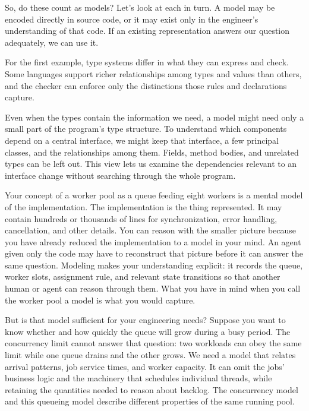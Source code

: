So, do these count as models? Let's look at each in turn. A model may be encoded directly in source code, or it may exist only in the engineer's understanding of that code. If an existing representation answers our question adequately, we can use it.

For the first example, type systems differ in what they can express and check. Some languages support richer relationships among types and values than others, and the checker can enforce only the distinctions those rules and declarations capture.

Even when the types contain the information we need, a model might need only a small part of the program's type structure. To understand which components depend on a central interface, we might keep that interface, a few principal classes, and the relationships among them. Fields, method bodies, and unrelated types can be left out. This view lets us examine the dependencies relevant to an interface change without searching through the whole program.

Your concept of a worker pool as a queue feeding eight workers is a mental model of the implementation. The implementation is the thing represented. It may contain hundreds or thousands of lines for synchronization, error handling, cancellation, and other details. You can reason with the smaller picture because you have already reduced the implementation to a model in your mind. An agent given only the code may have to reconstruct that picture before it can answer the same question. Modeling makes your understanding explicit: it records the queue, worker slots, assignment rule, and relevant state transitions so that another human or agent can reason through them. What you have in mind when you call the worker pool a model is what you would capture.

But is that model sufficient for your engineering needs? Suppose you want to know whether and how quickly the queue will grow during a busy period. The concurrency limit cannot answer that question: two workloads can obey the same limit while one queue drains and the other grows. We need a model that relates arrival patterns, job service times, and worker capacity. It can omit the jobs' business logic and the machinery that schedules individual threads, while retaining the quantities needed to reason about backlog. The concurrency model and this queueing model describe different properties of the same running pool.

